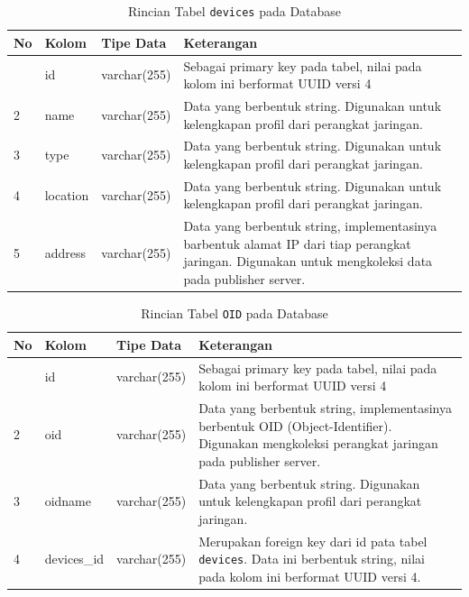     	\begin{longtable}{|p{}|p{}|p{}|p{}|} %
    		
    		\caption{Rincian Tabel \texttt{devices} pada Database} \label{tabeldbdevices} \\
    		\hline
    		\textbf{No} & \textbf{Kolom} & \textbf{Tipe Data} & \textbf{Keterangan} \\ \hline
    		\endhead
    		\endfoot
    		\endlastfoot
    		1 & id & varchar(255) & Sebagai primary key pada tabel, nilai pada kolom ini berformat UUID versi 4 \\ \hline
    		2 & name & varchar(255) & Data yang berbentuk string. Digunakan untuk kelengkapan profil dari perangkat jaringan. \\ \hline
    		3 & type & varchar(255) & Data yang berbentuk string. Digunakan untuk kelengkapan profil dari perangkat jaringan. \\ \hline
    		4 & location & varchar(255) & Data yang berbentuk string. Digunakan untuk kelengkapan profil dari perangkat jaringan. \\ \hline
    		5 & address & varchar(255) & Data yang berbentuk string, implementasinya barbentuk alamat IP dari tiap perangkat jaringan. Digunakan untuk mengkoleksi data pada publisher server. \\ \hline
    	\end{longtable}
    
    	\begin{longtable}{|p{}|p{}|p{}|p{}|} %
    		
    		\caption{Rincian Tabel \texttt{OID} pada Database} \label{tabeldboid} \\
    		\hline
    		\textbf{No} & \textbf{Kolom} & \textbf{Tipe Data} & \textbf{Keterangan} \\ \hline
    		\endhead
    		\endfoot
    		\endlastfoot
    		1 & id & varchar(255) & Sebagai primary key pada tabel, nilai pada kolom ini berformat UUID versi 4 \\ \hline
    		2 & oid & varchar(255) & Data yang berbentuk string, implementasinya berbentuk OID (Object-Identifier). Digunakan mengkoleksi perangkat jaringan pada publisher server. \\ \hline
    		3 & oidname & varchar(255) & Data yang berbentuk string. Digunakan untuk kelengkapan profil dari perangkat jaringan. \\ \hline
    		4 & devices\_id & varchar(255) & Merupakan foreign key dari id pata tabel \texttt{devices}. Data ini berbentuk string, nilai pada kolom ini berformat UUID versi 4. \\ \hline
    	\end{longtable}
    
